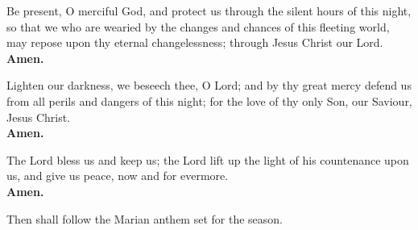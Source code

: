 Be present, O merciful God, and protect us through the silent hours of this
night, so that we who are wearied by the changes and chances of this fleeting
world, may repose upon thy eternal changelessness; through Jesus Christ our Lord.\\
\textbf{Amen.}

Lighten our darkness, we beseech thee, O Lord; and by thy great mercy defend
us from all perils and dangers of this night; for the love of thy only Son, our
Saviour, Jesus Christ.\\
\textbf{Amen.}


The Lord bless us and keep us; the Lord lift up the light of his countenance upon us, and give us peace, now and for evermore.\\
\textbf{Amen.}

\begin{rubric}
Then shall follow the Marian anthem set for the season.
\end{rubric}

\clearpage
